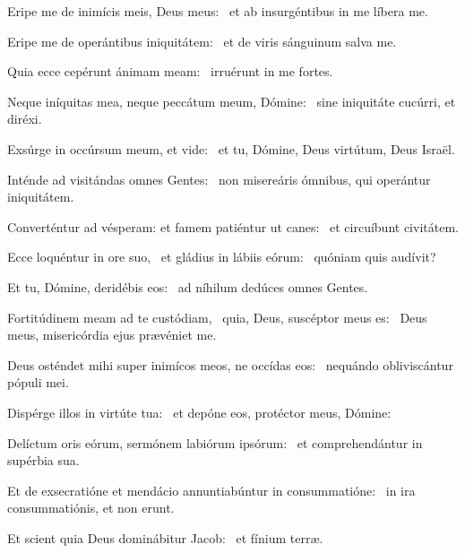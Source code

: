 \item Eripe me de inimícis meis, Deus meus:~\psstar{} et ab insurgéntibus in me líbera me.

\item Eripe me de operántibus iniquitátem:~\psstar{} et de viris sánguinum salva me.

\item Quia ecce cepérunt ánimam meam:~\psstar{} irruérunt in me fortes.

\item Neque iníquitas mea, neque peccátum meum, Dómine:~\psstar{} sine iniquitáte cucúrri, et diréxi.

\item Exsúrge in occúrsum meum, et vide:~\psstar{} et tu, Dómine, Deus virtútum, Deus Israël.

\item Inténde ad visitándas omnes Gentes:~\psstar{} non misereáris ómnibus, qui operántur iniquitátem.

\item Converténtur ad vésperam: et famem patiéntur ut canes:~\psstar{} et circuíbunt civitátem.

\item Ecce loquéntur in ore suo,~\pscross{} et gládius in lábiis eórum:~\psstar{} quóniam quis audívit?

\item Et tu, Dómine, deridébis eos:~\psstar{} ad níhilum dedúces omnes Gentes.

\item Fortitúdinem meam ad te custódiam,~\pscross{} quia, Deus, suscéptor meus es:~\psstar{} Deus meus, misericórdia ejus prævéniet me.

\item Deus osténdet mihi super inimícos meos, ne occídas eos:~\psstar{} nequándo obliviscántur pópuli mei.

\item Dispérge illos in virtúte tua:~\psstar{} et depóne eos, protéctor meus, Dómine:

\item Delíctum oris eórum, sermónem labiórum ipsórum:~\psstar{} et comprehendántur in supérbia sua.

\item Et de exsecratióne et mendácio annuntiabúntur in consummatióne:~\psstar{} in ira consummatiónis, et non erunt.

\item Et scient quia Deus dominábitur Jacob:~\psstar{} et fínium terræ.

